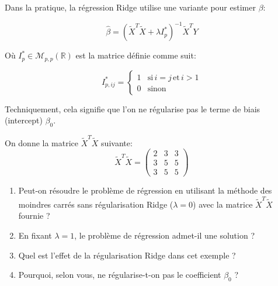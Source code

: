\documentclass[solutions]{../exercices}
\begin{document}
\begin{exercice}
Dans la pratique, la régression Ridge utilise une variante pour estimer $\beta$:

\begin{equation}
	\hat{\beta} = \left( \tilde{X}^T \tilde{X} + \lambda I_p^* \right)^{-1} \tilde{X}^T Y
	\label{eqn:ridge-2}
\end{equation}

Où $I_p^* \in \mathcal{M}_{p,p}(\mathbb{R})$ est la matrice définie comme suit:

\begin{equation}
	I_{p,ij}^* = \begin{cases}
		1 & \text{si} \, i = j \, \text{et} \, i > 1 \\
		0 & \text{sinon}
	\end{cases}
	\nonumber
\end{equation}

Techniquement, cela signifie que l'on ne régularise pas le terme de biais (intercept) $\beta_0$.

On donne la matrice $\tilde{X}^T \tilde{X}$ suivante:
\begin{equation}
	\tilde{X}^T \tilde{X} = 
	\begin{pmatrix}
		2 & 3 & 3 \\
		3 & 5 & 5 \\
		3 & 5 & 5
	\end{pmatrix}
	\nonumber
\end{equation}

\begin{enumerate}
	\item Peut-on résoudre le problème de régression en utilisant la méthode des moindres carrés sans régularisation Ridge ($\lambda = 0$) avec la matrice $\tilde{X}^T \tilde{X}$ fournie ?
	\item En fixant $\lambda = 1$, le problème de régression admet-il une solution ?
	\item Quel est l'effet de la régularisation Ridge dans cet exemple ?
	\item Pourquoi, selon vous, ne régularise-t-on pas le coefficient $\beta_0$ ?
\end{enumerate}
	
\end{exercice}
\end{document}
